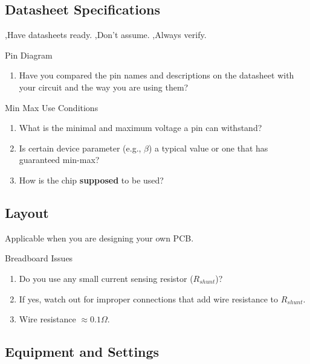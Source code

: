 \subsection{Datasheet Specifications}

\sep Have datasheets ready. \sep Don't assume. \sep Always verify.

\begin{textbox}{Pin Diagram}
\begin{enumerate}
    \item Have you compared the pin names and descriptions on the datasheet
    with your circuit and the way you are using them?
\end{enumerate}
    
\end{textbox}

\begin{textbox}{Min Max Use Conditions}
\begin{enumerate}
    \item What is the minimal and maximum voltage a pin can withstand?
    \item Is certain device parameter (e.g., $\beta$) a typical value or
    one that has guaranteed min-max?
    \item How is the chip \textbf{supposed} to be used? 
\end{enumerate}
    
\end{textbox}

\subsection{Layout}

Applicable when you are designing your own PCB.

\begin{textbox}{Breadboard Issues}
    \begin{enumerate}
        \item Do you use any small current sensing resistor ($R_{shunt}$)?
        \item If yes, watch out for improper connections that add
        wire resistance to $R_{shunt}$.
        \item Wire resistance $\approx 0.1 \Omega$.
    \end{enumerate}
\end{textbox}

\subsection{Equipment and Settings}


